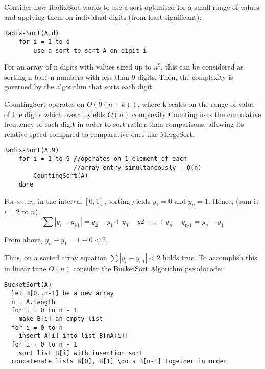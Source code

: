 \documentclass[11pt, a4paper]{article}
\begin{document}
  \vspace{20mm}



Consider how RadixSort works to use a sort optimised for a small range of values and applying them on individual digits (from least significant):

\begin{lstlisting}[frame=single]
Radix-Sort(A,d)
    for i = 1 to d
        use a sort to sort A on digit i
\end{lstlisting}

For an array of n digits with values sized up to $n^9$, this can be considered as sorting n base n numbers with less than 9 digits. Then, the complexity is governed by the algorithm that sorts each digit.

CountingSort operates on $O(9(n + k))$, where k scales on the range of value of the digits which overall yields $O(n)$ complexity
Counting uses the cumulative frequency of each digit in order to sort rather than comparisons, allowing its relative speed compared to comparative ones like MergeSort.
\begin{lstlisting}[frame=single]
Radix-Sort(A,9)
    for i = 1 to 9 //operates on 1 element of each
                   //array entry simultaneously - O(n)
        CountingSort(A) 
    done
\end{lstlisting}


For $x_1 .. x_n$ in the interval $[0,1]$, sorting yields $y_1 = 0$ and $y_n = 1$.
Hence, (sum is $i = 2$ to $n$)
\begin{equation}
  \sum |y_i - y_\text{i-1}|
                            = y_2 - y_1 + y_3 - y2 + .. + y_n - y_\text{n-1}
                            = y_n - y_1
\end{equation}

From above, $y_n - y_1 = 1 - 0 < 2$.

Thus, on a sorted array equation $\sum |y_i - y_\text{i-1}| < 2$ holds true.
To accomplish this in linear time $O(n)$ consider the BucketSort Algorithm pseudocode:

\begin{lstlisting}[frame=single]
BucketSort(A)
  let B[0..n-1] be a new array
  n = A.length
  for i = 0 to n - 1
    make B[i] an empty list
  for i = 0 to n
    insert A[i] into list B[nA[i]]
  for i = 0 to n - 1
    sort list B[i] with insertion sort
  concatenate lists B[0], B[1] \dots B[n-1] together in order
    
\end{lstlisting}
\end{document}
